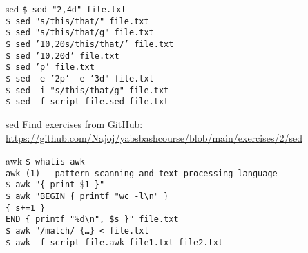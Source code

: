 \documentclass{beamer}
\let\tt\texttt
\begin{document}
\begin{frame}{sed}
        \tt{\$ sed "2,4d"              file.txt}\\
        \tt{\$ sed "s/this/that/"      file.txt}\\  
        \tt{\$ sed "s/this/that/g"     file.txt}\\  
        \tt{\$ sed '10,20s/this/that/' file.txt}\\  
        \tt{\$ sed '10,20d'            file.txt}\\  
        \tt{\$ sed 'p'                 file.txt}\\  
        \tt{\$ sed -e '2p' -e '3d"     file.txt}\\  
        \tt{\$ sed -i "s/this/that/g"  file.txt}\\  
        \tt{\$ sed -f script-file.sed  file.txt}\\  
\end{frame}

\begin{frame}{sed}
        Find exercises from GitHub: \\
        \url{https://github.com/Najoj/yabsbashcourse/blob/main/exercises/2/sed}
\end{frame}

\begin{frame}{awk}
        \tt{\$ whatis awk}\\
        \tt{awk (1)   - pattern scanning and text processing language}\\
        \tt{\$ awk "\{ print \$1 \}" } \\
        \tt{\$ awk "BEGIN \{ printf "wc -l{\textbackslash}n" \} } \\
        \tt{\quad \quad \{ s+=1 \}} \\
        \tt{\quad END \{ printf "\%d{\textbackslash}n", \$s \}" file.txt } \\
        \tt{\$ awk "/match/ \{\ldots \} < file.txt } \\
        \tt{\$ awk -f script-file.awk file1.txt file2.txt } \\
\end{frame}
\end{document}
